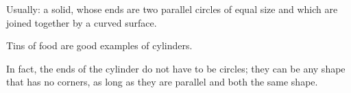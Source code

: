 Usually: a solid, whose ends are two parallel circles of equal size and which are joined together by a curved surface.
\par
Tins of food are good examples of cylinders.
\par
In fact, the ends of the cylinder do not have to be circles; they can be any shape that has no corners, as long as they are parallel and both the same shape.